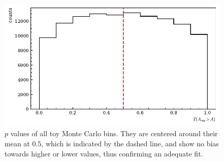 \begin{figure}[htbp]
	\centering
	\includegraphics[width=\linewidth]{../bayes/toyMC/plots/toyMC_pval_hist.pdf}
	\caption{$p$ values of all toy Monte Carlo bins. They are centered around their mean at $0.5$, which is indicated by the dashed line, and show no bias towards higher or lower values, thus confirming an adequate fit.}
	\label{fig:toymc_pvals}
\end{figure}

